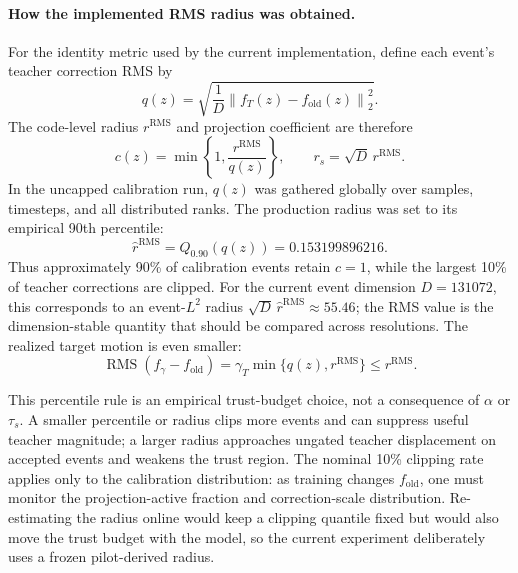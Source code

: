 \documentclass[11pt,a4paper]{article}
\newcommand{\norm}[1]{\left\lVert #1 \right\rVert}
\theoremstyle{plain}
\theoremstyle{definition}
\begin{document}
\paragraph{How the implemented RMS radius was obtained.}
For the identity metric used by the current implementation, define each event's teacher correction
RMS by
\begin{equation}
q(z)
=
\sqrt{\frac{1}{D}\norm{f_T(z)-f_{\mathrm{old}}(z)}_2^2}.
\label{eq:a2-delta-rms}
\end{equation}
The code-level radius $r^{\mathrm{RMS}}$ and projection coefficient are therefore
\begin{equation}
c(z)
=
\min\!\left\{1,\frac{r^{\mathrm{RMS}}}{q(z)}\right\},
\qquad
r_s=\sqrt D\,r^{\mathrm{RMS}}.
\label{eq:a2-rms-projection}
\end{equation}
In the uncapped calibration run, $q(z)$ was gathered globally over samples, timesteps, and all
distributed ranks.  The production radius was set to its empirical 90th percentile:
\begin{equation}
\widehat r^{\mathrm{RMS}}
=
Q_{0.90}\!\left(q(z)\right)
=
0.153199896216.
\label{eq:a2-radius-calibration}
\end{equation}
Thus approximately 90\% of calibration events retain $c=1$, while the largest 10\% of teacher
corrections are clipped.  For the current event dimension $D=131072$, this corresponds to an
event-$L^2$ radius $\sqrt D\,\widehat r^{\mathrm{RMS}}\approx55.46$; the RMS value is the
dimension-stable quantity that should be compared across resolutions.  The realized target motion
is even smaller:
\begin{equation}
\operatorname{RMS}(f_\gamma-f_{\mathrm{old}})
=
\gamma_T\min\{q(z),r^{\mathrm{RMS}}\}
\le r^{\mathrm{RMS}}.
\label{eq:a2-realized-rms}
\end{equation}

This percentile rule is an empirical trust-budget choice, not a consequence of $\alpha$ or
$\tau_s$.  A smaller percentile or radius clips more events and can suppress useful teacher
magnitude; a larger radius approaches ungated teacher displacement on accepted events and weakens
the trust region.  The nominal 10\% clipping rate applies only to the calibration distribution:
as training changes $f_{\mathrm{old}}$, one must monitor the projection-active fraction and
correction-scale distribution.  Re-estimating the radius online would keep a clipping quantile
fixed but would also move the trust budget with the model, so the current experiment deliberately
uses a frozen pilot-derived radius.
\end{document}
